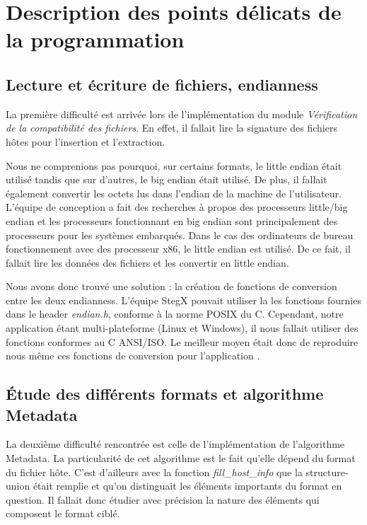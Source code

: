 \documentclass[11pt]{article}
\begin{document}
\section{Description des points délicats de la programmation}

\subsection{Lecture et écriture de fichiers, endianness}

La première difficulté est arrivée lors de l'implémentation du module 
\textit{Vérification de la compatibilité des fichiers}. En effet, il fallait 
lire la signature des fichiers hôtes pour l'insertion et l'extraction. 

Nous ne comprenions pas pourquoi, sur certains formats, le little endian était
utilisé tandis que sur d'autres, le big endian était utilisé. De plus, il
fallait également convertir les octets lus dans l'endian de la machine de
l'utilisateur. L'équipe de conception a fait des recherches à propos des
processeurs little/big endian et les processeurs fonctionnant en big endian sont
principalement des processeurs pour les systèmes embarqués. Dans le cas des
ordinateurs de bureau fonctionnement avec des processeur x86, le little endian
est utilisé. De ce fait, il fallait lire les données des fichiers et les
convertir en little endian. 

Nous avons donc trouvé une solution : la création de fonctions de conversion
entre les deux endianness. L'équipe StegX pouvait utiliser la les fonctions
fournies dans le header \textit{endian.h}, conforme à la norme POSIX du C.
Cependant, notre application étant multi-plateforme (Linux et Windows), il nous
fallait utiliser des fonctions conformes au C ANSI/ISO. Le meilleur moyen était
donc de reproduire nous même ces fonctions de conversion pour l'application 
\label{endian}. 

\subsection{Étude des différents formats et algorithme Metadata}

La deuxième difficulté rencontrée est celle de l'implémentation de l'algorithme
Metadata. La particularité de cet algorithme est le fait qu'elle dépend du
format du fichier hôte. C'est d'ailleurs avec la fonction
\textit{fill\_host\_info} que la structure-union était remplie et qu'on
distinguait les éléments importants du format en question.  Il fallait donc
étudier avec précision la nature des éléments qui composent le format ciblé.  
\end{document}

